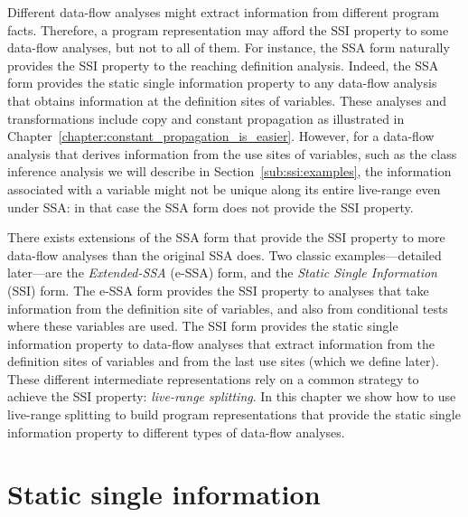 {Different data-flow analyses might extract information from different program
facts.
Therefore, a program representation may afford the SSI property to some data-flow
analyses, but not to all of them.
For instance, the SSA form naturally provides the SSI property to the reaching
definition analysis.
Indeed, the SSA form provides the static single information property to any
data-flow analysis that obtains information at the definition sites of
variables.
These analyses and transformations include copy and constant propagation \ifconstantprop as illustrated in Chapter~\ref{chapter:constant_propagation_is_easier}\fi.
However, for a data-flow analysis that derives information from the use sites 
of variables, such as the class inference analysis we will describe in 
Section~\ref{sub:ssi:examples}, the information associated with a variable 
might not be unique along its entire live-range even under SSA: in that case 
the SSA form does not provide the SSI property.

There exists extensions of the SSA form that provide the SSI property to more
data-flow analyses than the original SSA does.
Two classic examples---detailed later---are the {\em Extended-SSA} (e-SSA) 
form, and the {\em Static Single Information} (SSI) form.
The e-SSA form provides the SSI property to analyses that take information from
the definition site of variables, and also from conditional tests where these
variables are used.
The SSI form provides the static single information property to data-flow
analyses that extract information from the definition sites of variables and 
from the last use sites (which we define later).
These different intermediate representations rely on a common strategy to achieve the SSI property: {\em live-range splitting}.
In this chapter we show how to use live-range splitting to build program
representations that provide the static single information property to different
types of data-flow analyses.

\section{Static single information}
\label{sec:ssi:pereira:single}

}
